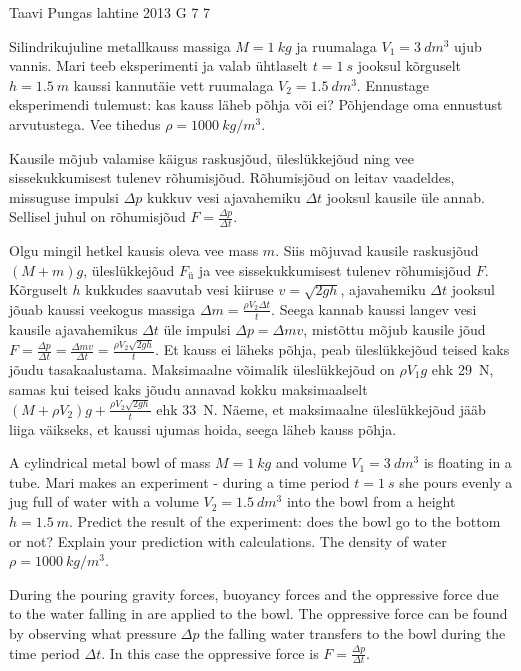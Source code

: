 {Taavi Pungas} %
{lahtine} %
{2013} %
{G 7} %
{7} %
{
\ifStatement
Silindrikujuline metallkauss massiga $M=\SI{1}{kg}$ ja ruumalaga
$V_1=\SI{3}{dm^3}$ ujub vannis. Mari teeb eksperimenti ja valab ühtlaselt
$t=\SI{1}{s}$ jooksul kõrguselt $h=\SI{1,5}{m}$ kaussi kannutäie vett ruumalaga
$V_2=\SI{1,5}{dm^3}$. Ennustage eksperimendi tulemust: kas kauss läheb põhja või
ei? Põhjendage oma ennustust arvutustega. Vee tihedus $\rho=\SI{1000}{kg/m^3}$.
\fi


\ifHint
Kausile mõjub valamise käigus raskusjõud, üleslükkejõud ning vee sissekukkumisest tulenev rõhumisjõud. Rõhumisjõud on leitav vaadeldes, missuguse impulsi $\Delta p$ kukkuv vesi ajavahemiku $\Delta t$ jooksul kausile üle annab. Sellisel juhul on rõhumisjõud $F = \frac{\Delta p}{\Delta t}$.
\fi


\ifSolution
Olgu mingil hetkel kausis oleva vee mass $m$. Siis mõjuvad kausile raskusjõud $(M+m)g$, üleslükkejõud $F_{ü}$ ja vee sissekukkumisest tulenev rõhumisjõud $F$. Kõrguselt $h$ kukkudes saavutab vesi kiiruse $v=\sqrt{2gh}$, ajavahemiku $\Delta t$ jooksul jõuab kaussi veekogus massiga $\Delta m = \frac{\rho V_2 \Delta t}{t}$. Seega kannab kaussi langev vesi kausile ajavahemikus $\Delta t$ üle impulsi $\Delta p =\Delta m v$, mistõttu mõjub kausile jõud $F=\frac{\Delta p}{\Delta t}=\frac{\Delta m v}{\Delta t}=\frac{\rho V_2 \sqrt{2gh}}{t}$. Et kauss ei läheks põhja, peab üleslükkejõud teised kaks jõudu tasakaalustama. Maksimaalne võimalik üleslükkejõud on $\rho V_1 g$ ehk \SI{29}{N}, samas kui teised kaks jõudu annavad kokku maksimaalselt $(M+\rho V_2)g + \frac{\rho V_2 \sqrt{2gh}}{t}$ ehk \SI{33}{N}. Näeme, et maksimaalne üleslükkejõud jääb liiga väikseks, et kaussi ujumas hoida, seega läheb kauss põhja.
\fi


\ifEngStatement
A cylindrical metal bowl of mass $M=\SI{1}{kg}$ and volume $V_1=\SI{3}{dm^3}$ is floating in a tube. Mari makes an experiment - during a time period $t=\SI{1}{s}$ she pours evenly a jug full of water with a volume $V_2=\SI{1,5}{dm^3}$ into the bowl from a height $h=\SI{1,5}{m}$. Predict the result of the experiment: does the bowl go to the bottom or not? Explain your prediction with calculations. The density of water $\rho=\SI{1000}{kg/m^3}$.
\fi


\ifEngHint
During the pouring gravity forces, buoyancy forces and the oppressive force due to the water falling in are applied to the bowl. The oppressive force can be found by observing what pressure $\Delta p$ the falling water transfers to the bowl during the time period $\Delta t$. In this case the oppressive force is $F = \frac{\Delta p}{\Delta t}$.
\fi


}
